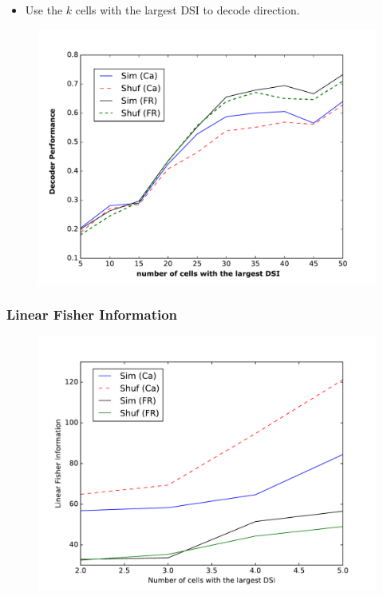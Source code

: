 \documentclass[10pt,mathserif]{beamer}
\begin{document}
\begin{frame}
\begin{itemize}
\item Use the $k$ cells with the largest DSI to decode direction.
\end{itemize}
\begin{figure}
\includegraphics[scale=0.42]{best_r.pdf}
\end{figure}
   \end{frame}


{

}


\begin{frame}
\frametitle{\bf Linear Fisher Information}
\begin{figure}
\includegraphics[scale=0.42]{fisher.pdf}
\end{figure}
   \end{frame}
\end{document}
